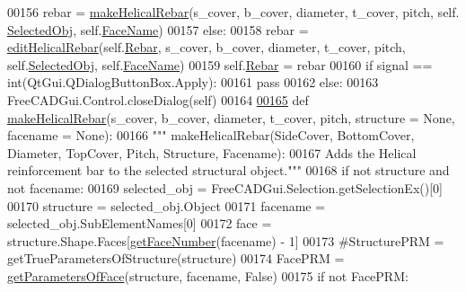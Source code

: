 \begin{DoxyCode}
00156             rebar = \hyperlink{namespaceHelicalRebar_a8a4f12ed70819996ac31877957dfab08}{makeHelicalRebar}(s\_cover, b\_cover, diameter, t\_cover, pitch, self.
      \hyperlink{classHelicalRebar_1_1__HelicalRebarTaskPanel_a6666e765dc0ac4e8bd4d5c1825862795}{SelectedObj}, self.\hyperlink{classHelicalRebar_1_1__HelicalRebarTaskPanel_ac6f5e0df8c90110fdcb82cb9725ae6b6}{FaceName})
00157         \textcolor{keywordflow}{else}:
00158             rebar = \hyperlink{namespaceHelicalRebar_aea0d3838b1b171f801acf1046d111c8b}{editHelicalRebar}(self.\hyperlink{classHelicalRebar_1_1__HelicalRebarTaskPanel_a18e1b46858c6d4ca5f6925d69ea15807}{Rebar}, s\_cover, b\_cover, diameter, t\_cover, 
      pitch, self.\hyperlink{classHelicalRebar_1_1__HelicalRebarTaskPanel_a6666e765dc0ac4e8bd4d5c1825862795}{SelectedObj}, self.\hyperlink{classHelicalRebar_1_1__HelicalRebarTaskPanel_ac6f5e0df8c90110fdcb82cb9725ae6b6}{FaceName})
00159         self.\hyperlink{classHelicalRebar_1_1__HelicalRebarTaskPanel_a18e1b46858c6d4ca5f6925d69ea15807}{Rebar} = rebar
00160         \textcolor{keywordflow}{if} signal == int(QtGui.QDialogButtonBox.Apply):
00161             \textcolor{keywordflow}{pass}
00162         \textcolor{keywordflow}{else}:
00163             FreeCADGui.Control.closeDialog(self)
00164 
\hypertarget{HelicalRebar_8py_source.tex_l00165}{}\hyperlink{namespaceHelicalRebar_a8a4f12ed70819996ac31877957dfab08}{00165} \textcolor{keyword}{def }\hyperlink{namespaceHelicalRebar_a8a4f12ed70819996ac31877957dfab08}{makeHelicalRebar}(s\_cover, b\_cover, diameter, t\_cover, pitch, structure = None, facename
       = None):
00166     \textcolor{stringliteral}{""" makeHelicalRebar(SideCover, BottomCover, Diameter, TopCover, Pitch, Structure, Facename):}
00167 \textcolor{stringliteral}{    Adds the Helical reinforcement bar to the selected structural object."""}
00168     \textcolor{keywordflow}{if} \textcolor{keywordflow}{not} structure \textcolor{keywordflow}{and} \textcolor{keywordflow}{not} facename:
00169         selected\_obj = FreeCADGui.Selection.getSelectionEx()[0]
00170         structure = selected\_obj.Object
00171         facename = selected\_obj.SubElementNames[0]
00172     face = structure.Shape.Faces[\hyperlink{namespaceRebarfunc_a3885b3b63e3a41508ac79bc7550cf301}{getFaceNumber}(facename) - 1]
00173     \textcolor{comment}{#StructurePRM = getTrueParametersOfStructure(structure)}
00174     FacePRM = \hyperlink{namespaceRebarfunc_a92122b3d7cedd3d47bb63380a5ac4d08}{getParametersOfFace}(structure, facename, \textcolor{keyword}{False})
00175     \textcolor{keywordflow}{if} \textcolor{keywordflow}{not} FacePRM:

\end{DoxyCode}
